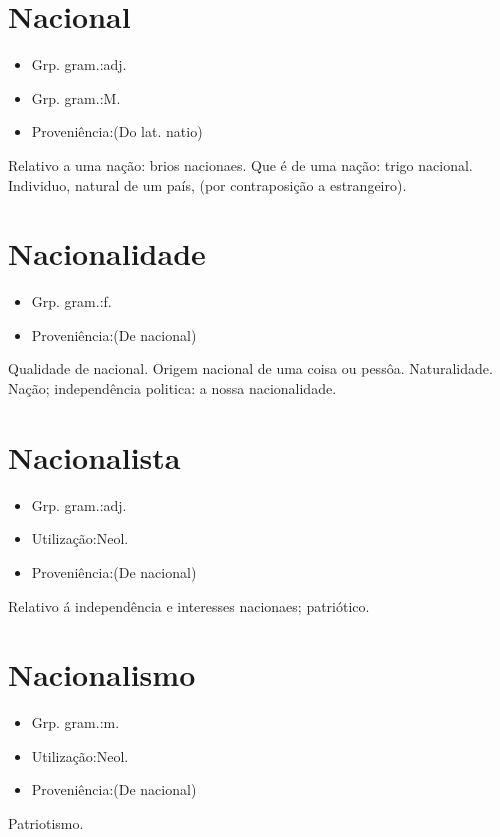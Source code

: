 \section{Nacional}
\begin{itemize}
\item {Grp. gram.:adj.}
\end{itemize}
\begin{itemize}
\item {Grp. gram.:M.}
\end{itemize}
\begin{itemize}
\item {Proveniência:(Do lat. \textunderscore natio\textunderscore )}
\end{itemize}
Relativo a uma nação: \textunderscore brios nacionaes\textunderscore .
Que é de uma nação: \textunderscore trigo nacional\textunderscore .
Individuo, natural de um país, (por contraposição a estrangeiro).
\section{Nacionalidade}
\begin{itemize}
\item {Grp. gram.:f.}
\end{itemize}
\begin{itemize}
\item {Proveniência:(De \textunderscore nacional\textunderscore )}
\end{itemize}
Qualidade de nacional.
Origem nacional de uma coisa ou pessôa.
Naturalidade.
Nação; independência politica: \textunderscore a nossa nacionalidade\textunderscore .
\section{Nacionalista}
\begin{itemize}
\item {Grp. gram.:adj.}
\end{itemize}
\begin{itemize}
\item {Utilização:Neol.}
\end{itemize}
\begin{itemize}
\item {Proveniência:(De \textunderscore nacional\textunderscore )}
\end{itemize}
Relativo á independência e interesses nacionaes; patriótico.
\section{Nacionalismo}
\begin{itemize}
\item {Grp. gram.:m.}
\end{itemize}
\begin{itemize}
\item {Utilização:Neol.}
\end{itemize}
\begin{itemize}
\item {Proveniência:(De \textunderscore nacional\textunderscore )}
\end{itemize}
Patriotismo.
